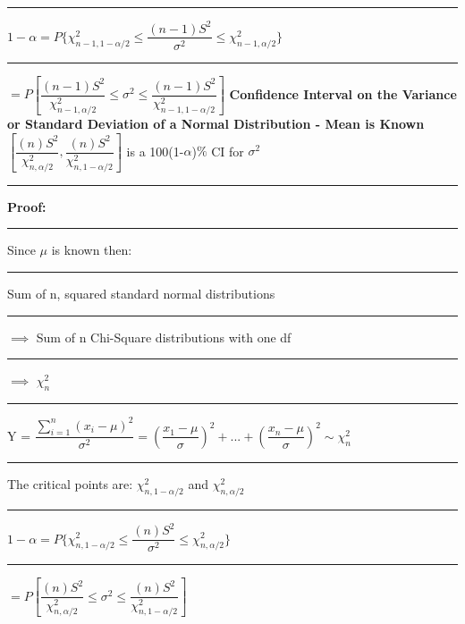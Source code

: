 \documentclass[]{article}
\begin{document}
\newline
\newline\Large\rule{3.0cm}{0pt} $1 - \alpha = P \{ \chi^{2}_{n-1,1-\alpha/2 } \le \dfrac{(n-1)S^2}{\sigma^2} \le \chi^{2}_{n-1,\alpha/2 } \} $
\newline
\newline\Large\rule{4.3cm}{0pt} $= P \left[  \dfrac{(n-1)S^2}{\chi^{2}_{n-1,\alpha/2 }}      \le   \sigma^2   \le  \dfrac{(n-1)S^2}{\chi^{2}_{n-1,1-\alpha/2 }}   \right]$
\newline 
\newline 
\Large\textbf{Confidence Interval on the Variance or Standard Deviation of \newline a Normal Distribution - Mean is Known}
\newline
\newline
$\left[ \dfrac{(n)S^2}{\chi^{2}_{n,\alpha/2 }}, \dfrac{(n)S^2}{\chi^{2}_{n,1-\alpha/2 }} \right] $ is a 100(1-$\alpha$)$\%$ CI for $\sigma^2$ 
\newline 
\newline
\newline\Large\rule{3.0cm}{0pt} \textbf{Proof:}
\newline\Large\rule{3.0cm}{0pt} Since $\mu$ is known then:
\newline\Large\rule{3.0cm}{0pt} Sum of n, squared standard normal distributions 
\newline\Large\rule{3.0cm}{0pt} $\implies$ Sum of n Chi-Square distributions with one df
\newline\Large\rule{3.0cm}{0pt} $\implies$ $\chi^{2}_{n}$
\newline 
\newline\Large\rule{3.0cm}{0pt}  Y = $\dfrac{ \sum_{i=1}^{n} (x_i - \mu )^2  }{ \sigma^2 } = \left( \dfrac{x_1 - \mu }{\sigma} \right) ^2 + ...+ \left( \dfrac{x_n - \mu }{\sigma} \right) ^2  \sim \chi^{2}_{n}$
\newline
\newline\Large\rule{3.0cm}{0pt} The critical points are: $\chi^{2}_{n,1-\alpha/2 }$ and $\chi^{2}_{n,\alpha/2 }$
\newline
\newline\Large\rule{3.0cm}{0pt} $1 - \alpha = P \{ \chi^{2}_{n,1-\alpha/2 } \le \dfrac{(n)S^2}{\sigma^2} \le \chi^{2}_{n,\alpha/2 } \} $
\newline
\newline\Large\rule{4.3cm}{0pt} $= P \left[  \dfrac{(n)S^2}{\chi^{2}_{n,\alpha/2 }}      \le   \sigma^2   \le  \dfrac{(n)S^2}{\chi^{2}_{n,1-\alpha/2 }}   \right]$
\end{document}
